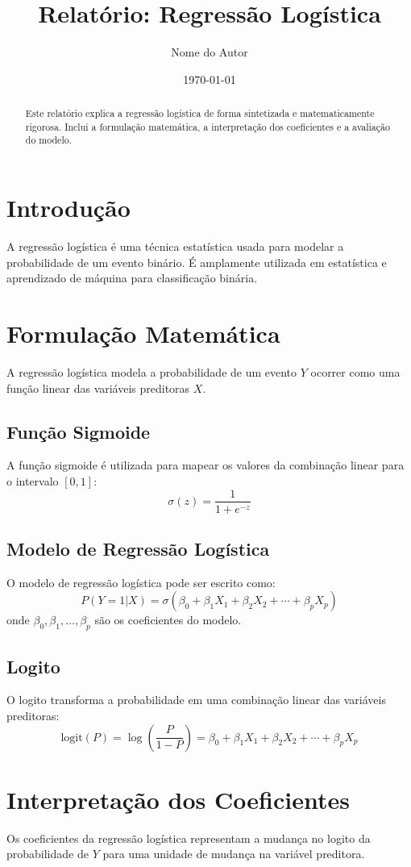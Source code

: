 \documentclass{article}
\title{Relatório: Regressão Logística}
\author{Nome do Autor}
\date{\today}
\begin{document}
\maketitle

\begin{abstract}
Este relatório explica a regressão logística de forma sintetizada e matematicamente rigorosa. Inclui a formulação matemática, a interpretação dos coeficientes e a avaliação do modelo.
\end{abstract}

\section{Introdução}
A regressão logística é uma técnica estatística usada para modelar a probabilidade de um evento binário. É amplamente utilizada em estatística e aprendizado de máquina para classificação binária.

\section{Formulação Matemática}
A regressão logística modela a probabilidade de um evento \(Y\) ocorrer como uma função linear das variáveis preditoras \(X\).

\subsection{Função Sigmoide}
A função sigmoide é utilizada para mapear os valores da combinação linear para o intervalo \([0, 1]\):
\[
\sigma(z) = \frac{1}{1 + e^{-z}}
\]

\subsection{Modelo de Regressão Logística}
O modelo de regressão logística pode ser escrito como:
\[
P(Y=1|X) = \sigma(\beta_0 + \beta_1 X_1 + \beta_2 X_2 + \cdots + \beta_p X_p)
\]
onde \( \beta_0, \beta_1, \ldots, \beta_p \) são os coeficientes do modelo.

\subsection{Logito}
O logito transforma a probabilidade em uma combinação linear das variáveis preditoras:
\[
\text{logit}(P) = \log\left(\frac{P}{1-P}\right) = \beta_0 + \beta_1 X_1 + \beta_2 X_2 + \cdots + \beta_p X_p
\]

\section{Interpretação dos Coeficientes}
Os coeficientes da regressão logística representam a mudança no logito da probabilidade de \(Y\) para uma unidade de mudança na variável preditora.
\end{document}
